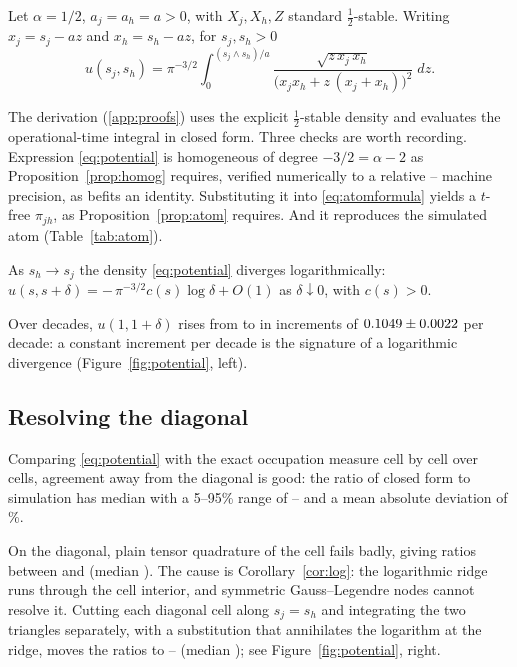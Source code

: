 \documentclass{ws-ijtaf}
\begin{document}
\begin{theorem}\label{thm:potential}
Let $\alpha=1/2$, $a_j=a_h=a>0$, with $X_j,X_h,Z$ standard $\tfrac12$-stable.
Writing $x_j=s_j-az$ and $x_h=s_h-az$, for $s_j,s_h>0$
\begin{equation}
u(s_j,s_h)
= \pi^{-3/2}\int_{0}^{(s_j\wedge s_h)/a}
\frac{\sqrt{z\,x_j\,x_h}}
     {\big(x_j x_h + z\,(x_j+x_h)\big)^{2}}\; dz .
\label{eq:potential}
\end{equation}
\end{theorem}

The derivation (\ref{app:proofs}) uses the explicit $\tfrac12$-stable
density and evaluates the operational-time integral in closed form. Three checks
are worth recording. Expression \eqref{eq:potential} is homogeneous of degree
$-3/2=\alpha-2$ as Proposition~\ref{prop:homog} requires, verified numerically
to a relative \potHomogMaxErr{} -- machine precision, as befits an identity.
Substituting it into \eqref{eq:atomformula} yields a $t$-free $\pi_{jh}$, as
Proposition~\ref{prop:atom} requires. And it reproduces the simulated atom
(Table~\ref{tab:atom}).

\begin{corollary}\label{cor:log}
As $s_h\to s_j$ the density \eqref{eq:potential} diverges logarithmically:
$u(s,s+\delta) = -\,\pi^{-3/2}c(s)\log\delta + O(1)$ as $\delta\downarrow0$,
with $c(s)>0$.
\end{corollary}

Over \logSingNDecades{} decades, $u(1,1+\delta)$ rises from \logSingFirst{} to
\logSingLast{} in increments of $0.1049 \pm 0.0022$ per
decade: a constant increment per decade is the signature of a logarithmic
divergence (Figure~\ref{fig:potential}, left).

\subsection{Resolving the diagonal}

Comparing \eqref{eq:potential} with the exact occupation measure cell by cell
over \potNCells{} cells, agreement away from the diagonal is good: the ratio of
closed form to simulation has median \potOffMedian{} with a 5--95\% range of
\potOffPlo{}--\potOffPhi{} and a mean absolute deviation of \potOffMAD{}\%.

On the diagonal, plain tensor quadrature of the cell fails badly, giving ratios
between \potDiagBoxLo{} and \potDiagBoxHi{} (median \potDiagBoxMedian{}). The
cause is Corollary~\ref{cor:log}: the logarithmic ridge runs through the cell
interior, and symmetric Gauss--Legendre nodes cannot resolve it. Cutting each
diagonal cell along $s_j=s_h$ and integrating the two triangles separately, with
a substitution that annihilates the logarithm at the ridge, moves the ratios to
\potDiagSplitLo{}--\potDiagSplitHi{} (median \potDiagSplitMedian{}); see
Figure~\ref{fig:potential}, right.
\end{document}
